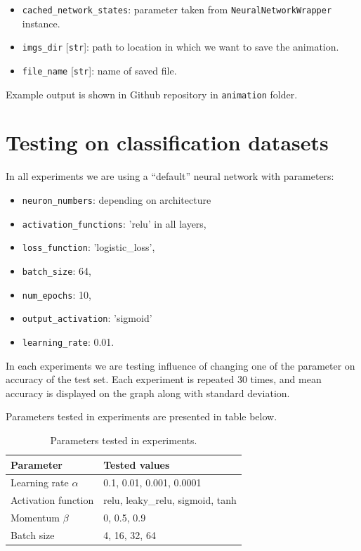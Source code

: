 \documentclass[a4]{article}
\begin{document}
\begin{itemize}
	\item \texttt{cached\_network\_states}: parameter taken from \texttt{NeuralNetworkWrapper} instance.
	\item \texttt{imgs\_dir} [\texttt{str}]: path to location in which we want to save the animation.
	\item \texttt{file\_name} [\texttt{str}]: name of saved file.
\end{itemize}
Example output is shown in Github repository in \texttt{animation} folder.

\newpage
\section{Testing on classification datasets}

In all experiments we are using a ``default'' neural network with parameters:
\begin{itemize}
    \item \texttt{neuron\_numbers}: depending on architecture
    \item \texttt{activation\_functions}: 'relu' in all layers,
    \item \texttt{loss\_function}: 'logistic\_loss',
    \item \texttt{batch\_size}: 64,
    \item \texttt{num\_epochs}: 10,
    \item \texttt{output\_activation}: 'sigmoid'
    \item \texttt{learning\_rate}: 0.01.
\end{itemize}
In each experiments we are testing influence of changing one of the parameter on accuracy of the test set. Each experiment is repeated 30 times, and mean accuracy is displayed on the graph along with standard deviation. 

Parameters tested in experiments are presented in table below. 

\bgroup
\def\arraystretch{1.5}
\begin{table}[!h]
    \centering
    \begin{tabular}{ll}
        Parameter              & Tested values \\ \hline
        Learning rate $\alpha$ &    0.1, 0.01, 0.001, 0.0001           \\
        Activation function    &    relu, leaky\_relu, sigmoid, tanh           \\
        Momentum $\beta$       &    0, 0.5, 0.9           \\
        Batch size             &    4, 16, 32, 64       
    \end{tabular}
    \caption{Parameters tested in experiments.}
\end{table}
\egroup
\end{document}
